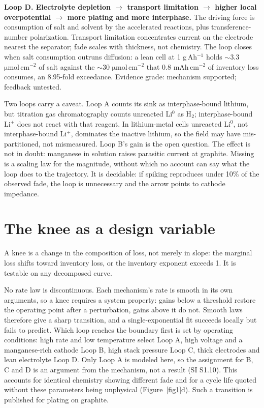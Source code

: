 \documentclass[AMA,Times2COL]{WileyNJDv5}
\begin{document}
\textbf{Loop D. Electrolyte depletion $\rightarrow$ transport limitation $\rightarrow$ higher local overpotential $\rightarrow$ more plating and more interphase.} The driving force is consumption of salt and solvent by the accelerated reactions, plus transference-number polarization.\cite{lithiummetal2026science,fang2019quantifying} Transport limitation concentrates current on the electrode nearest the separator; fade scales with thickness, not chemistry. The loop closes when salt consumption outruns diffusion: a lean cell at 1 g\,Ah$^{-1}$ holds $\sim$3.3 $\mathrm{\mu mol\,cm^{-2}}$ of salt against the $\sim$30 $\mathrm{\mu mol\,cm^{-2}}$ that 0.8 mAh\,cm$^{-2}$ of inventory loss consumes, an 8.95-fold exceedance. Evidence grade: mechanism supported; feedback untested.

Two loops carry a caveat. Loop A counts its sink as interphase-bound lithium, but titration gas chromatography counts unreacted Li$^{0}$ as H$_2$; interphase-bound Li$^{+}$ does not react with that reagent.\cite{fang2019quantifying} In lithium-metal cells unreacted Li$^{0}$, not interphase-bound Li$^{+}$, dominates the inactive lithium, so the field may have mis-partitioned, not mismeasured. Loop B's gain is the open question. The effect is not in doubt: manganese in solution raises parasitic current at graphite.\cite{tornheim2026quantifying} Missing is a scaling law for the magnitude, without which no account can say what the loop does to the trajectory. It is decidable: if spiking reproduces under 10\% of the observed fade, the loop is unnecessary and the arrow points to cathode impedance.

\section{The knee as a design variable}\label{sec:Thekneeasadesignvariable}
A knee is a change in the composition of loss, not merely in slope: the marginal loss shifts toward inventory loss, or the inventory exponent exceeds 1. It is testable on any decomposed curve.

No rate law is discontinuous. Each mechanism's rate is smooth in its own arguments, so a knee requires a system property: gains below a threshold restore the operating point after a perturbation, gains above it do not. Smooth laws therefore give a sharp transition, and a single-exponential fit succeeds locally but fails to predict. Which loop reaches the boundary first is set by operating conditions: high rate and low temperature select Loop A, high voltage and a manganese-rich cathode Loop B, high stack pressure Loop C, thick electrodes and lean electrolyte Loop D. Only Loop A is modeled here, so the assignment for B, C and D is an argument from the mechanism, not a result (SI S1.10). This accounts for identical chemistry showing different fade and for a cycle life quoted without these parameters being unphysical (Figure~\ref{fig1}d). Such a transition is published for plating on graphite.\cite{klein2024identifying}
\end{document}
